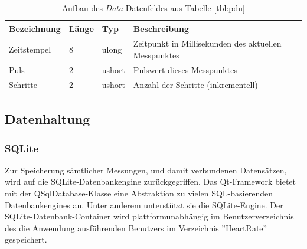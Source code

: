 \begin{table}[h]
	\centering
		\begin{tabularx}{\textwidth}{l|l|l|X}
			\hline
			Bezeichnung & Länge & Typ & Beschreibung \\
			\hline
			\hline
			Zeitstempel & 8 & ulong & Zeitpunkt in Millisekunden des aktuellen Messpunktes\\
			\hline
			Puls & 2 & ushort & Pulswert dieses Messpunktes\\
			\hline
			Schritte & 2 & ushort & Anzahl der Schritte (inkrementell)\\
			\hline
		\end{tabularx}
		\caption{Aufbau des \textit{Data}-Datenfeldes aus Tabelle \ref{tbl:pdu}}
		\label{tbl:datafield-description}
\end{table}

\subsection{Datenhaltung}
\subsubsection{SQLite}
Zur Speicherung sämtlicher Messungen, und damit verbundenen Datensätzen, wird auf die SQLite-Datenbankengine zurückgegriffen. Das Qt-Framework bietet mit der QSqlDatabase-Klasse eine Abstraktion zu vielen SQL-basierenden Datenbankengines an\cite{qsqldatabase}. Unter anderem unterstützt sie die SQLite-Engine. Der SQLite-Datenbank-Container wird plattformunabhängig im Benutzerverzeichnis des die Anwendung ausführenden Benutzers im Verzeichnis ''HeartRate'' gespeichert.

